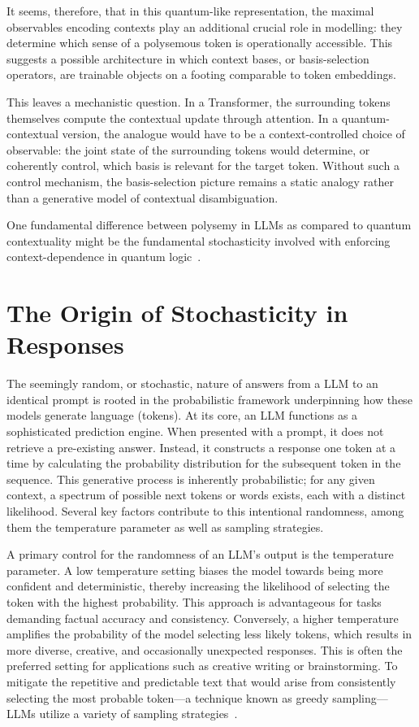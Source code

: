 \documentclass[%
  reprint,
  superscriptaddress,
  showpacs,
  showkeys,
  amsmath,amssymb,
  pra,
  longbibliography,
  floatfix,
  x11names
]{revtex4-2}
\begin{document}
It seems, therefore, that in this quantum-like representation,
the maximal observables encoding contexts play an additional crucial role in modelling:
they determine which sense of a polysemous token is operationally accessible.
This suggests a possible architecture in which context bases, or basis-selection operators, are trainable objects on a footing comparable to token embeddings.

This leaves a mechanistic question.
In a Transformer, the surrounding tokens themselves compute the contextual update through attention.
In a quantum-contextual version, the analogue would have to be a context-controlled choice of observable:
the joint state of the surrounding tokens would determine, or coherently control, which basis is relevant for the target token.
Without such a control mechanism, the basis-selection picture remains a static analogy rather than a generative model of contextual disambiguation.

One fundamental difference between polysemy in LLMs as compared to quantum contextuality might be the fundamental stochasticity
involved with enforcing context-dependence in quantum logic~\cite{specker-60,kochen1}.




\section{The Origin of Stochasticity in Responses}
\label{section:stochasticity}
The seemingly random, or stochastic, nature of answers from a LLM to an identical prompt
is rooted in the probabilistic framework underpinning how these models generate language (tokens).
At its core, an LLM functions as a sophisticated prediction engine.
When presented with a prompt, it does not retrieve a pre-existing answer.
Instead, it constructs a response one token at a time by calculating
the probability distribution for the subsequent token in the sequence.
This generative process is inherently probabilistic;
for any given context, a spectrum of possible next tokens or words exists,
each with a distinct likelihood.
Several key factors contribute to this intentional randomness,
among them the temperature parameter  as well as sampling strategies.

A primary control for the randomness of an LLM's output is the {temperature} parameter.
A low temperature setting biases the model towards being more confident and deterministic,
thereby increasing the likelihood of selecting the token with the highest probability.
This approach is advantageous for tasks demanding factual accuracy and consistency.
Conversely, a higher temperature amplifies the probability of the model selecting less likely tokens,
which results in more diverse, creative, and occasionally unexpected responses.
This is often the preferred setting for applications such as creative writing or brainstorming.
To mitigate the repetitive and predictable text that would arise from consistently selecting
the most probable token---a technique known as greedy sampling---LLMs utilize a
variety of sampling strategies~\cite{Jadhav2025}.
\end{document}
